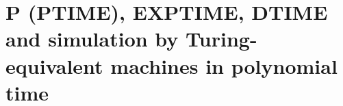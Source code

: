 
\chapter{P (PTIME), EXPTIME, DTIME and simulation by Turing-equivalent machines in polynomial time}

